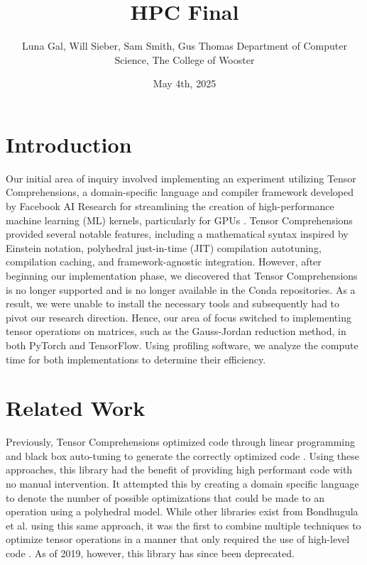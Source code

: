 \documentclass[12pt]{article}
\title{HPC Final}
\date{May 4th, 2025}
\author{\parbox{\linewidth}{\centering%
    Luna Gal, Will Sieber, Sam Smith, Gus Thomas
	\endgraf\bigskip
	Department of Computer Science, The College of Wooster
	\bigskip
}}
\begin{document}
\maketitle

\newpage
\tableofcontents
\newpage

\lstlistoflistings
\newpage

\section{Introduction}
Our initial area of inquiry involved implementing an experiment utilizing Tensor Comprehensions, a domain-specific language and compiler framework developed by Facebook AI Research for streamlining the creation of high-performance machine learning (ML) kernels, particularly for GPUs \cite{tens}. Tensor Comprehensions provided several notable features, including a mathematical syntax inspired by Einstein notation, polyhedral just-in-time (JIT) compilation autotuning, compilation caching, and framework-agnostic integration. However, after beginning our implementation phase, we discovered that Tensor Comprehensions is no longer supported and is no longer available in the Conda repositories. As a result, we were unable to install the necessary tools and subsequently had to pivot our research direction. Hence, our area of focus switched to implementing tensor operations on matrices, such as the Gauss-Jordan reduction method, in both PyTorch and TensorFlow. Using profiling software, we analyze the compute time for both implementations to determine their efficiency.

\section{Related Work}
Previously, Tensor Comprehensions optimized code through linear programming and black box auto-tuning to generate the correctly optimized code \cite{neu}. Using these approaches, this library had the benefit of providing high performant code with no manual intervention. It attempted this by creating a domain specific language to denote the number of possible optimizations that could be made to an operation using a polyhedral model. While other libraries exist from Bondhugula et al. using this same approach, it was the first to combine multiple techniques to optimize tensor operations in a manner that only required the use of high-level code \cite{neu, bondhugula2008practical}. As of 2019, however, this library has since been deprecated.
\end{document}
